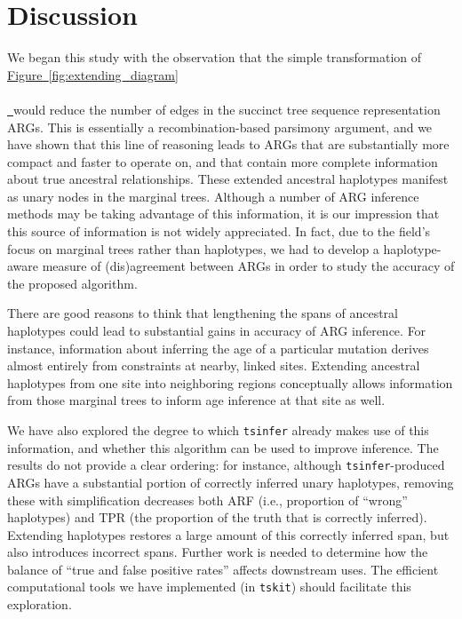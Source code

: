 \documentclass[10pt,twoside,lineno]{gsajnl}
\newcommand{\tskit}{\texttt{tskit}}
\newcommand{\tsinfer}{\texttt{tsinfer}}
\newcommand*{\figref}[2][]{%
	\hyperref[{#2}]{%
		Figure~\ref*{#2}%
		\ifx\\#1\\%
		\else
		\,#1%
		\fi
	}%
}
\begin{document}
\section{Discussion}

We began this study with the observation that the simple transformation
of \figref{fig:extending_diagram} would reduce the number of edges
in the succinct tree sequence representation ARGs.
This is essentially a recombination-based parsimony argument,
and we have shown that this line of reasoning
leads to ARGs that are substantially more compact and faster to operate on,
and that contain more complete information about true ancestral relationships.
These extended ancestral haplotypes manifest as unary nodes in the marginal trees.
Although a number of ARG inference methods may be taking advantage of this information,
it is our impression that this source of information is not widely appreciated.
In fact, due to the field's focus on marginal trees rather than haplotypes,
we had to develop a haplotype-aware measure of (dis)agreement between ARGs in order to study the accuracy of the proposed algorithm.

There are good reasons to think that lengthening the spans of ancestral haplotypes
could lead to substantial gains in accuracy of ARG inference.
For instance, information about inferring the age of a particular mutation
derives almost entirely from constraints at nearby, linked sites.
Extending ancestral haplotypes from one site into neighboring regions
conceptually allows information from those marginal trees
to inform age inference at that site as well.

We have also explored the degree to which \tsinfer{} already makes use of this information,
and whether this algorithm can be used to improve inference.
The results do not provide a clear ordering:
for instance, although \tsinfer-produced ARGs
have a substantial portion of correctly inferred unary haplotypes,
removing these with simplification decreases both ARF
(i.e., proportion of ``wrong'' haplotypes)
and TPR (the proportion of the truth that is correctly inferred).
Extending haplotypes restores a large amount of this correctly inferred span,
but also introduces incorrect spans.
Further work is needed to determine how the balance of ``true and false positive rates''
affects downstream uses.
The efficient computational tools we have implemented (in \tskit{})
should facilitate this exploration.
\end{document}
